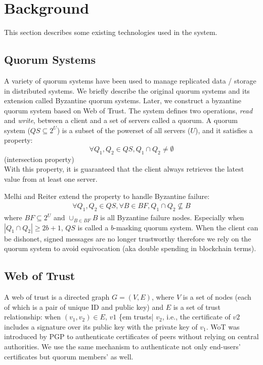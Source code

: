 \documentclass[twoside,twocolumn,10pt,fleqn]{article}
\begin{document}
\section{Background}

This section describes some existing technologies used in the system.

\subsection{Quorum Systems}
A variety of quorum systems have been used to manage replicated data /
storage in distributed systems. We briefly describe the original
quorum systems and its extension called Byzantine quorum
systems. Later, we construct a byzantine quorum system based on Web of
Trust.
The system defines two operations, {\em read} and {\em write}, between
a client and a set of servers called a quorum. A quorum system ($QS
\subseteq 2^U$) is a subset of the powerset of all servers ($U$), and
it satisfies a property:
\[
  \forall Q_1, Q_2 \in QS, Q_1 \cap Q_2 \neq \emptyset
\]
\hfill (intersection property)\\

With this property, it is guaranteed that the client always retrieves
the latest value from at least one server.

Melhi and Reiter \cite{Delhi:1} extend the property to handle
Byzantine failure:
\begin{align*}
  \forall Q_1, Q_2 \in QS, \forall B \in BF, Q_1 \cap Q_2 \nsubseteq B
\end{align*}
where $BF \subseteq 2^U$ and $\cup_{B \in BF} B$ is all Byzantine
failure nodes.
Especially when $|Q_1 \cap Q_2| \geq 2b+1$, $QS$ is called a $b$-masking
quorum system. When the client can be dishonet, signed messages are no
longer trustworthy therefore we rely on the quorum system to avoid
equivocation (aka double spending in blockchain terms).

\subsection{Web of Trust}
A web of trust is a directed graph $G = (V, E)$, where $V$ is a set of
nodes (each of which is a pair of unique ID and public key) and $E$ is a
set of trust relationship: when $(v_1, v_2) \in E$, $v1$ \{em trusts|
$v_2$,
i.e., the certificate of $v2$ includes a signature over its public key
with the private key of $v_1$. WoT was introduced by PGP to
authenticate certificates of peers without relying on central
authorities. We use the same mechanism to authenticate not only
end-users' certificates but quorum members' as well.
\end{document}
